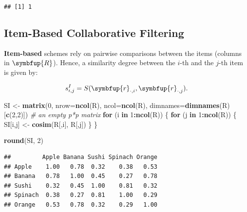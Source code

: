 \documentclass[10pt,b5paper,krantz1]{krantz}
\newenvironment{Shaded}{\begin{snugshade}}{\end{snugshade}}
\newcommand{\CommentTok}[1]{\textcolor[rgb]{0.37,0.37,0.37}{\textit{#1}}}
\newcommand{\ControlFlowTok}[1]{\textcolor[rgb]{0.27,0.27,0.27}{\textbf{#1}}}
\newcommand{\DataTypeTok}[1]{\textcolor[rgb]{0.27,0.27,0.27}{#1}}
\newcommand{\DecValTok}[1]{\textcolor[rgb]{0.06,0.06,0.06}{#1}}
\newcommand{\KeywordTok}[1]{\textcolor[rgb]{0.27,0.27,0.27}{\textbf{#1}}}
\newcommand{\NormalTok}[1]{#1}
\newcommand{\OperatorTok}[1]{\textcolor[rgb]{0.43,0.43,0.43}{\textbf{#1}}}
\newcommand{\StringTok}[1]{\textcolor[rgb]{0.5,0.5,0.5}{#1}}
\renewcommand{\mathbf}[1]{\symbfup{#1}}
\begin{document}
\begin{verbatim}
## [1] 1
\end{verbatim}

\hypertarget{item-based-collaborative-filtering}{%
\subsection{Item-Based Collaborative Filtering}\label{item-based-collaborative-filtering}}

\textbf{Item-based} schemes rely on pairwise comparisons between the items
(columns in \(\mathbf{R}\)). Hence, a similarity degree between the \(i\)-th and the \(j\)-th
item is given by:

\[
s^I_{i,j} = S(\mathbf{r}_{\cdot,i},\mathbf{r}_{\cdot,j}).
\]

\begin{Shaded}
\begin{Highlighting}[]
\NormalTok{SI <-}\StringTok{ }\KeywordTok{matrix}\NormalTok{(}\DecValTok{0}\NormalTok{, }\DataTypeTok{nrow=}\KeywordTok{ncol}\NormalTok{(R), }\DataTypeTok{ncol=}\KeywordTok{ncol}\NormalTok{(R),}
    \DataTypeTok{dimnames=}\KeywordTok{dimnames}\NormalTok{(R)[}\KeywordTok{c}\NormalTok{(}\DecValTok{2}\NormalTok{,}\DecValTok{2}\NormalTok{)]) }\CommentTok{# an empty p*p matrix}
\ControlFlowTok{for}\NormalTok{ (i }\ControlFlowTok{in} \DecValTok{1}\OperatorTok{:}\KeywordTok{ncol}\NormalTok{(R)) \{}
    \ControlFlowTok{for}\NormalTok{ (j }\ControlFlowTok{in} \DecValTok{1}\OperatorTok{:}\KeywordTok{ncol}\NormalTok{(R)) \{}
\NormalTok{        SI[i,j] <-}\StringTok{ }\KeywordTok{cosim}\NormalTok{(R[,i], R[,j])}
\NormalTok{    \}}
\NormalTok{\}}
\end{Highlighting}
\end{Shaded}

\begin{Shaded}
\begin{Highlighting}[]
\KeywordTok{round}\NormalTok{(SI, }\DecValTok{2}\NormalTok{)}
\end{Highlighting}
\end{Shaded}

\begin{verbatim}
##         Apple Banana Sushi Spinach Orange
## Apple    1.00   0.78  0.32    0.38   0.53
## Banana   0.78   1.00  0.45    0.27   0.78
## Sushi    0.32   0.45  1.00    0.81   0.32
## Spinach  0.38   0.27  0.81    1.00   0.29
## Orange   0.53   0.78  0.32    0.29   1.00
\end{verbatim}
\end{document}
